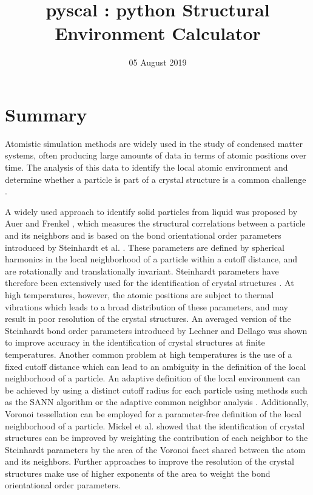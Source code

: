 \documentclass[]{article}
\title{pyscal : python Structural Environment Calculator}
\date{05 August 2019}
\begin{document}
\maketitle

\section{Summary}\label{summary}

Atomistic simulation methods are widely used in the study of condensed
matter systems, often producing large amounts of data in terms of atomic
positions over time. The analysis of this data to identify the local
atomic environment and determine whether a particle is part of a crystal
structure is a common challenge \citep{Stukowski:2012}.

A widely used approach to identify solid particles from liquid was
proposed by Auer and Frenkel \citep{Auer:2005}, which measures the
structural correlations between a particle and its neighbors and is
based on the bond orientational order parameters introduced by
Steinhardt et al. \citep{Steinhardt:1983}. These parameters are defined
by spherical harmonics in the local neighborhood of a particle within a
cutoff distance, and are rotationally and translationally invariant.
Steinhardt parameters have therefore been extensively used for the
identification of crystal structures \citep[ and references
within]{Mickel:2013}. At high temperatures, however, the atomic
positions are subject to thermal vibrations which leads to a broad
distribution of these parameters, and may result in poor resolution of
the crystal structures. An averaged version of the Steinhardt bond order
parameters introduced by Lechner and Dellago \citep{Lechner:2008} was
shown to improve accuracy in the identification of crystal structures at
finite temperatures. Another common problem at high temperatures is the
use of a fixed cutoff distance which can lead to an ambiguity in the
definition of the local neighborhood of a particle. An adaptive
definition of the local environment can be achieved by using a distinct
cutoff radius for each particle using methods such as the SANN algorithm
\citep{VanMeel:2012} or the adaptive common neighbor analysis
\citep{Stukowski:2012}. Additionally, Voronoi tessellation can be
employed for a parameter-free definition of the local neighborhood of a
particle. Mickel et al. showed \citep{Mickel:2013} that the
identification of crystal structures can be improved by weighting the
contribution of each neighbor to the Steinhardt parameters by the area
of the Voronoi facet shared between the atom and its neighbors. Further
approaches to improve the resolution of the crystal structures make use
of higher exponents of the area to weight the bond orientational order
parameters\citep{Haeberle:2019}.
\end{document}
